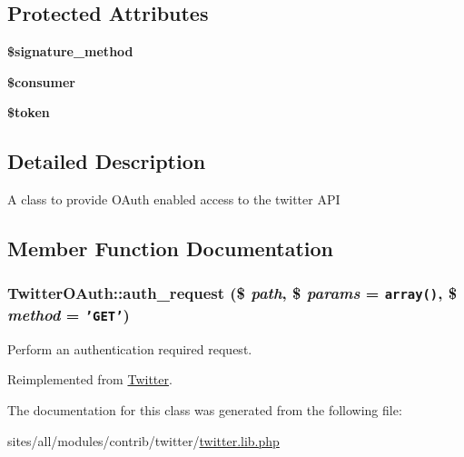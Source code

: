 \subsection*{Protected Attributes}
\begin{CompactItemize}
\item 
\hypertarget{classTwitterOAuth_7833bba376f5ad4d1fafc6f4f21f919b}{
\textbf{\$signature\_\-method}}
\label{classTwitterOAuth_7833bba376f5ad4d1fafc6f4f21f919b}

\item 
\hypertarget{classTwitterOAuth_00141ee09280f2fe1d36adca9bcaee45}{
\textbf{\$consumer}}
\label{classTwitterOAuth_00141ee09280f2fe1d36adca9bcaee45}

\item 
\hypertarget{classTwitterOAuth_31bbd7563674f1feeb71e528167aea06}{
\textbf{\$token}}
\label{classTwitterOAuth_31bbd7563674f1feeb71e528167aea06}

\end{CompactItemize}


\subsection{Detailed Description}
A class to provide OAuth enabled access to the twitter API 

\subsection{Member Function Documentation}
\hypertarget{classTwitterOAuth_186e14f18c9097450c53892405600b86}{
\subsubsection[{auth\_\-request}]{\setlength{\rightskip}{0pt plus 5cm}TwitterOAuth::auth\_\-request (\$ {\em path}, \/  \$ {\em params} = {\tt array()}, \/  \$ {\em method} = {\tt 'GET'})}}
\label{classTwitterOAuth_186e14f18c9097450c53892405600b86}


Perform an authentication required request. 

Reimplemented from \hyperlink{classTwitter_be4761ddb2a687520077da1748675edd}{Twitter}.

The documentation for this class was generated from the following file:\begin{CompactItemize}
\item 
sites/all/modules/contrib/twitter/\hyperlink{twitter_8lib_8php}{twitter.lib.php}\end{CompactItemize}
